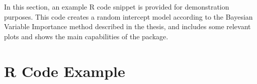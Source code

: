 


In this section, an example R code snippet is provided for demonstration purposes. This code creates a random intercept model according to the Bayesian Variable Importance method described in the thesis, and includes some relevant plots and shows the main capabilities of the package. 

\section*{R Code Example}
